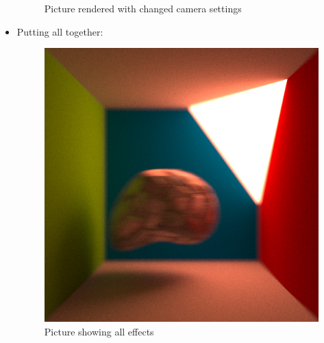 \documentclass[11pt,a4paper]{article}
\begin{document}
\begin{itemize}
\begin{figure}[H]
\begin{center}
\caption[Picture showing changed camera settings]{Picture rendered with changed camera settings}
\label{fig:6}
\end{center}
\end{figure}

\item
Putting all together:
\begin{figure}[H]
\begin{center}
\includegraphics[scale=0.4]{images/deformedstone2100spp}
\caption[Picture showing all effects]{Picture showing all effects}
\label{fig:7}
\end{center}
\end{figure}

\end{itemize}

\newpage


\end{document}
